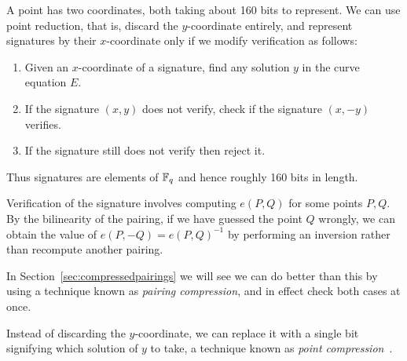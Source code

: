 A point has two coordinates, both taking about 160 bits to represent.
We can use point reduction, that is, discard the $y$-coordinate entirely,
and represent signatures by their $x$-coordinate only if we modify
verification as follows:
\begin{enumerate}
\item
Given an $x$-coordinate of a signature, find any solution $y$
in the curve equation $E$.
\item
If the signature $(x,y)$ does not verify,
check if the signature $(x, -y)$ verifies.
\item
If the signature still does not verify then reject it.
\end{enumerate}

Thus signatures are elements of $\mathbb{F}_q$ and hence roughly 160 bits in length.

Verification of the signature involves computing $e(P, Q)$ for some points
$P, Q$. By the bilinearity of the pairing, if we have guessed the point $Q$
wrongly, we can obtain the value of $e(P,-Q) = e(P,Q)^{-1}$ by performing
an inversion rather than recompute another pairing.

In Section~\ref{sec:compressedpairings} we will see we can do better
than this by using a technique known
as \emph{pairing compression}, and in effect check both
cases at once.

Instead of discarding the $y$-coordinate, we can
replace it with a single bit signifying which solution of $y$ to take,
a technique known as \emph{point compression}~\cite[Section IV.4]{bss}.
